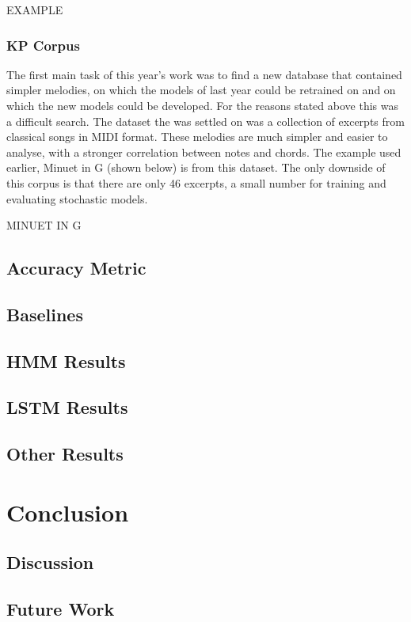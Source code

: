 \documentclass[bsc,singlespacing,logo, parskip, deptreport]{infthesis}
\begin{document}
EXAMPLE

\subsection{KP Corpus} \label{kp}
The first main task of this year's work was to find a new database that contained simpler melodies, on which the models of last year could be retrained on and on which the new models could be developed. For the reasons stated above this was a difficult search. The dataset the was settled on was a collection of excerpts from classical songs in MIDI format. These melodies are much simpler and easier to analyse, with a stronger correlation between notes and chords. The example used earlier, Minuet in G (shown below) is from this dataset. The only downside of this corpus is that there are only 46 excerpts, a small number for training and evaluating stochastic models.

MINUET IN G

\section{Accuracy Metric}



\section{Baselines}

\section{HMM Results}

\section{LSTM Results} \label{LSTM Results}

\section{Other Results}


\chapter{Conclusion}

\section{Discussion}

\section{Future Work}



\end{document}
